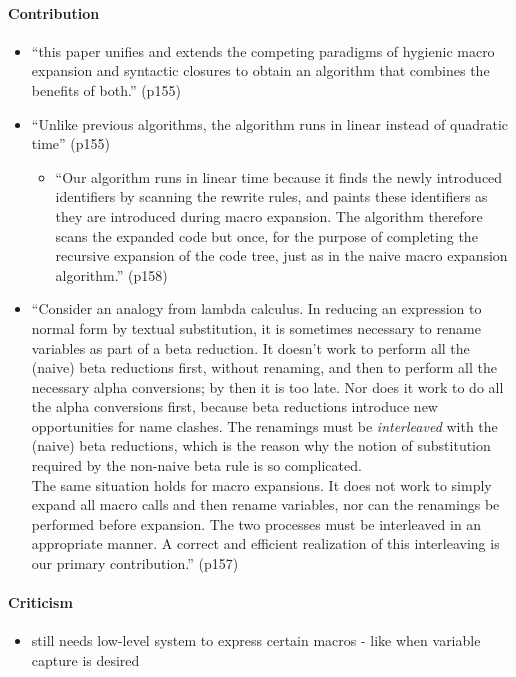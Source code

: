 \documentclass[12pt]{article}	%
\begin{document}
\paragraph{Contribution}
\begin{itemize}
	\item ``this paper unifies and extends the competing paradigms of hygienic macro expansion and syntactic closures to obtain an algorithm that combines the benefits of both.'' (p155)
	\item ``Unlike previous algorithms, the algorithm runs in linear instead of quadratic time'' (p155)
		\begin{itemize}
			\item ``Our algorithm runs in linear time because it finds the newly introduced identifiers by scanning the rewrite rules, and paints these identifiers as they are introduced during macro expansion. The algorithm therefore scans the expanded code but once, for the purpose of completing the recursive expansion of the code tree, just as in the naive macro expansion algorithm.'' (p158)
		\end{itemize}
	\item ``Consider an analogy from lambda calculus. In reducing an expression to normal form by textual substitution, it is sometimes necessary to rename variables as part of a beta reduction. It doesn't work to perform all the (naive) beta reductions first, without renaming, and then to perform all the necessary alpha conversions; by then it is too late. Nor does it work to do all the alpha conversions first, because beta reductions introduce new opportunities for name clashes. The renamings must be \textit{interleaved} with the (naive) beta reductions, which is the reason why the notion of substitution required by the non-naive beta rule is so complicated. \\

The same situation holds for macro expansions. It does not work to simply expand all macro calls and then rename variables, nor can the renamings be performed before expansion. The two processes must be interleaved in an appropriate manner. A correct and efficient realization of this interleaving is our primary contribution.'' (p157)
\end{itemize}
\paragraph{Criticism}
\begin{itemize}
	\item still needs low-level system to express certain macros - like when variable capture is desired
\end{itemize}
\end{document}
